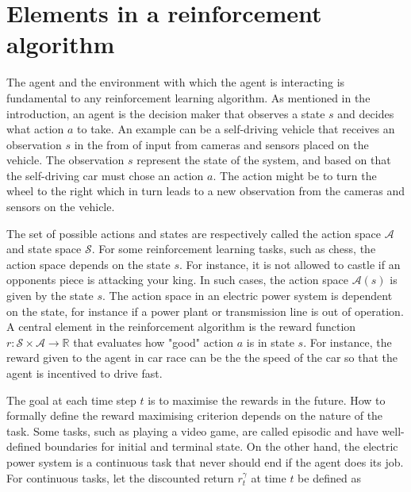 \documentclass[class=book, crop=false]{standalone}
\begin{document}
\section{Elements in a reinforcement algorithm}

The agent and the environment with which the agent is interacting is fundamental to any reinforcement learning algorithm. As mentioned in the introduction, an agent is the decision maker that observes a state $s$ and decides what action $a$ to take. An example can be a self-driving vehicle that receives an observation $s$ in the from of input from cameras and sensors placed on the vehicle. The observation $s$ represent the state of the system, and based on that the self-driving car must chose an action $a$. The action might be to turn the wheel to the right which in turn leads to a new observation from the cameras and sensors on the vehicle.

The set of possible actions and states are respectively called the action space $\mathcal{A}$ and state space $\mathcal{S}$. For some reinforcement learning tasks, such as chess, the action space depends on the state $s$. For instance, it is not allowed to castle if an opponents piece is attacking your king. In such cases, the action space $\mathcal{A}(s)$ is given by the state $s$. The action space in an electric power system is dependent on the state, for instance if a power plant or transmission line is out of operation. A central element in the reinforcement algorithm is the reward function $r: \mathcal{S} \times \mathcal{A} \to \mathbb{R}$ that evaluates how "good" action $a$ is in state $s$. For instance, the reward given to the agent in car race can be the the speed of the car so that the agent is incentived to drive fast.

The goal at each time step $t$ is to maximise the rewards in the future. How to formally define the reward maximising criterion depends on the nature of the task. Some tasks, such as playing a video game, are called episodic and have well-defined boundaries for initial and terminal state. On the other hand, the electric power system is a continuous task that never should end if the agent does its job. For continuous tasks, let the discounted return $r^{\gamma}_{t}$ at time $t$ be defined as 
\end{document}

